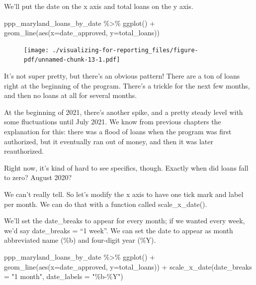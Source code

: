 \documentclass[
  letterpaper,
  DIV=11,
  numbers=noendperiod]{scrreprt}
\newenvironment{Shaded}{\begin{snugshade}}{\end{snugshade}}
\newcommand{\AttributeTok}[1]{\textcolor[rgb]{0.40,0.45,0.13}{#1}}
\newcommand{\FunctionTok}[1]{\textcolor[rgb]{0.28,0.35,0.67}{#1}}
\newcommand{\NormalTok}[1]{\textcolor[rgb]{0.00,0.23,0.31}{#1}}
\newcommand{\SpecialCharTok}[1]{\textcolor[rgb]{0.37,0.37,0.37}{#1}}
\newcommand{\StringTok}[1]{\textcolor[rgb]{0.13,0.47,0.30}{#1}}
\begin{document}
We'll put the date on the x axis and total loans on the y axis.

\begin{Shaded}
\begin{Highlighting}[]
\NormalTok{ppp\_maryland\_loans\_by\_date }\SpecialCharTok{\%\textgreater{}\%}
  \FunctionTok{ggplot}\NormalTok{() }\SpecialCharTok{+}
  \FunctionTok{geom\_line}\NormalTok{(}\FunctionTok{aes}\NormalTok{(}\AttributeTok{x=}\NormalTok{date\_approved, }\AttributeTok{y=}\NormalTok{total\_loans))}
\end{Highlighting}
\end{Shaded}

\begin{figure}[H]

{\centering \texttt{[image: ./visualizing-for-reporting\_files/figure-pdf/unnamed-chunk-13-1.pdf]}

}

\end{figure}

It's not super pretty, but there's an obvious pattern! There are a ton
of loans right at the beginning of the program. There's a trickle for
the next few months, and then no loans at all for several months.

At the beginning of 2021, there's another spike, and a pretty steady
level with some fluctuations until July 2021. We know from previous
chapters the explanation for this: there was a flood of loans when the
program was first authorized, but it eventually ran out of money, and
then it was later reauthorized.

Right now, it's kind of hard to see specifics, though. Exactly when did
loans fall to zero? August 2020?

We can't really tell. So let's modify the x axis to have one tick mark
and label per month. We can do that with a function called
scale\_x\_date().

We'll set the date\_breaks to appear for every month; if we wanted every
week, we'd say date\_breaks = ``1 week''. We can set the date to appear
as month abbreviated name (\%b) and four-digit year (\%Y).

\begin{Shaded}
\begin{Highlighting}[]
\NormalTok{ppp\_maryland\_loans\_by\_date }\SpecialCharTok{\%\textgreater{}\%}
  \FunctionTok{ggplot}\NormalTok{() }\SpecialCharTok{+}
  \FunctionTok{geom\_line}\NormalTok{(}\FunctionTok{aes}\NormalTok{(}\AttributeTok{x=}\NormalTok{date\_approved, }\AttributeTok{y=}\NormalTok{total\_loans)) }\SpecialCharTok{+}
  \FunctionTok{scale\_x\_date}\NormalTok{(}\AttributeTok{date\_breaks =} \StringTok{"1 month"}\NormalTok{, }\AttributeTok{date\_labels =} \StringTok{"\%b{-}\%Y"}\NormalTok{)}
\end{Highlighting}
\end{Shaded}
\end{document}
